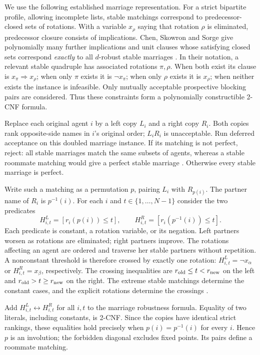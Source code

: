 \documentclass[11pt]{article}
\begin{document}
We use the following established marriage representation. For a strict
bipartite profile, allowing incomplete lists, stable matchings correspond
to predecessor-closed sets of rotations. With a variable $x_\rho$ saying
that rotation $\rho$ is eliminated, predecessor closure consists of
implications. Chen, Skowron and Sorge give polynomially many further
implications and unit clauses whose satisfying closed sets correspond
\emph{exactly} to all $d$-robust stable marriages
\cite[Proposition 3.9, Lemmas 3.15 and 3.19, and proof of Theorem 3.24]{css}.
In their notation, a relevant stable quadruple has associated rotations
$\pi,\rho$. When both exist its clause is $x_\pi\Rightarrow x_\rho$;
when only $\pi$ exists it is $\neg x_\pi$; when only $\rho$ exists it is
$x_\rho$; when neither exists the instance is infeasible. Only mutually
acceptable prospective blocking pairs are considered. Thus these
constraints form a polynomially constructible 2-CNF formula.

Replace each original agent $i$ by a left copy $L_i$ and a right copy
$R_i$. Both copies rank opposite-side names in $i$'s original order;
$L_iR_i$ is unacceptable. Run deferred acceptance on this doubled
marriage instance. If its matching is not perfect, reject: all stable
marriages match the same subsets of agents, whereas a stable roommate
matching would give a perfect stable marriage
\cite[Proposition 2.3]{css}. Otherwise every stable marriage is perfect.

Write such a matching as a permutation $p$, pairing $L_i$ with $R_{p(i)}$.
The partner name of $R_i$ is $p^{-1}(i)$. For each $i$ and
$t\in\{1,\ldots,N-1\}$ consider the two predicates
\[
 H^L_{i,t}=[r_i(p(i))\leq t],\qquad
 H^R_{i,t}=[r_i(p^{-1}(i))\leq t].
\]
Each predicate is constant, a rotation variable, or its negation. Left partners worsen as
rotations are eliminated; right partners improve. The rotations affecting
an agent are ordered and traverse her stable partners without repetition.
A nonconstant threshold is therefore crossed by exactly one rotation:
$H^L_{i,t}=\neg x_\alpha$ or $H^R_{i,t}=x_\beta$, respectively.
The crossing inequalities are $r_{\rm old}\leq t<r_{\rm new}$ on the
left and $r_{\rm old}>t\geq r_{\rm new}$ on the right.
The extreme stable matchings determine the constant cases, and the
explicit rotations determine the crossings
\cite[Proposition 3.6(ii),(iv)]{css}.

Add $H^L_{i,t}\leftrightarrow H^R_{i,t}$ for all $i,t$ to the marriage
robustness formula. Equality of two literals, including constants, is
2-CNF. Since the copies have identical strict rankings, these equalities
hold precisely when $p(i)=p^{-1}(i)$ for every $i$. Hence $p$ is an
involution; the forbidden diagonal excludes fixed points. Its pairs
define a roommate matching.
\end{document}
